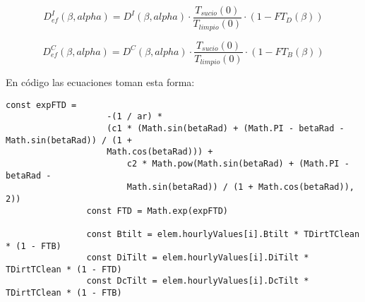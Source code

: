 \begin{equation}
D_{ef}^I(\beta, alpha) = D^I(\beta, alpha) \cdot \frac{T_{sucio}(0)}{T_{limpio}(0)} \cdot (1-FT_D(\beta))
\end{equation}

\begin{equation}
D_{ef}^C(\beta, alpha) = D^C(\beta, alpha) \cdot \frac{T_{sucio}(0)}{T_{limpio}(0)} \cdot (1-FT_B(\beta))
\end{equation}

En código las ecuaciones toman esta forma:
\begin{lstlisting}[style=ES6, caption={Cálculo de las componentes efectivas}]
				const expFTD =
					-(1 / ar) *
					(c1 * (Math.sin(betaRad) + (Math.PI - betaRad - Math.sin(betaRad)) / (1 + 
					Math.cos(betaRad))) +
						c2 * Math.pow(Math.sin(betaRad) + (Math.PI - betaRad - 
						Math.sin(betaRad)) / (1 + Math.cos(betaRad)), 2))
				const FTD = Math.exp(expFTD)

				const Btilt = elem.hourlyValues[i].Btilt * TDirtTClean * (1 - FTB)
				const DiTilt = elem.hourlyValues[i].DiTilt * TDirtTClean * (1 - FTD)
				const DcTilt = elem.hourlyValues[i].DcTilt * TDirtTClean * (1 - FTB)
\end{lstlisting}


